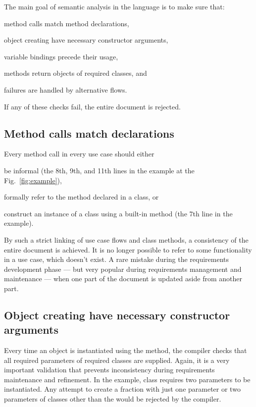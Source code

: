 \documentclass[sigplan,10pt,nonacm=true]{acmart}
\begin{document}
The main goal of semantic analysis in the language is to make sure that:
\begin{inparaenum}
\item method calls match method declarations,
\item object creating have necessary constructor arguments,
\item variable bindings precede their usage,
\item methods return objects of required classes, and
\item failures are handled by alternative flows.
\end{inparaenum}
If any of these checks fail, the entire document is rejected.

\subsection{Method calls match declarations}

Every method call in every use case should either
\begin{inparaenum}
\item be informal (the 8th, 9th, and 11th lines in the example at the Fig.~\ref{fig:example}),
\item formally refer to the method declared in a class, or
\item construct an instance of a class using a built-in method  (the 7th line in the example).
\end{inparaenum}

By such a strict linking of use case flows and class methods, a consistency
of the entire document is achieved. It is no longer possible to refer to
some functionality in a use case, which doesn't exist. A rare mistake during
the requirements development phase --- but very popular during requirements
management and maintenance --- when one part of the document is updated aside
from another part.

\subsection{Object creating have necessary constructor arguments}

Every time an object is instantiated using the  method,
the compiler checks that all required parameters of required classes are
supplied. Again, it is a very important validation that prevents inconsistency
during requirements maintenance and refinement. In the example, class
 requires two parameters to be instantiated. Any attempt to
create a fraction with just one parameter or two parameters of classes other
than the  would be rejected by the compiler.
\end{document}
